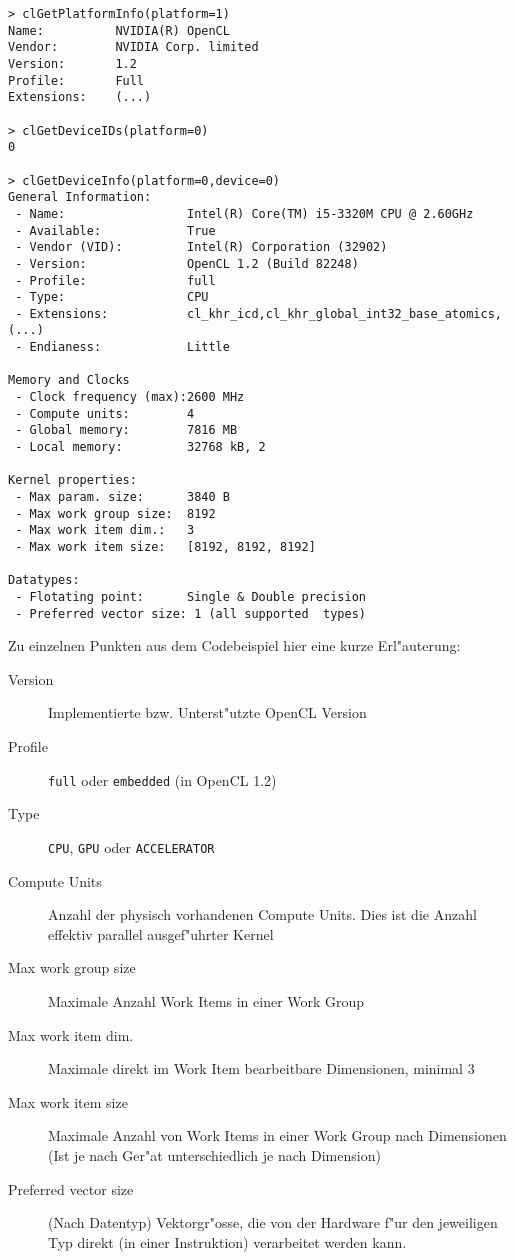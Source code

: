 \begin{refsection}
\begin{small}
\begin{verbatim}
> clGetPlatformInfo(platform=1)
Name:          NVIDIA(R) OpenCL
Vendor:        NVIDIA Corp. limited
Version:       1.2
Profile:       Full
Extensions:    (...)

> clGetDeviceIDs(platform=0)
0

> clGetDeviceInfo(platform=0,device=0)
General Information:
 - Name:                 Intel(R) Core(TM) i5-3320M CPU @ 2.60GHz
 - Available:            True
 - Vendor (VID):         Intel(R) Corporation (32902)
 - Version:              OpenCL 1.2 (Build 82248)
 - Profile:              full
 - Type:                 CPU 
 - Extensions:           cl_khr_icd,cl_khr_global_int32_base_atomics,(...)
 - Endianess:            Little

Memory and Clocks
 - Clock frequency (max):2600 MHz
 - Compute units:        4
 - Global memory:        7816 MB
 - Local memory:         32768 kB, 2

Kernel properties:
 - Max param. size:      3840 B
 - Max work group size:  8192
 - Max work item dim.:   3
 - Max work item size:   [8192, 8192, 8192]

Datatypes:
 - Flotating point:      Single & Double precision
 - Preferred vector size: 1 (all supported  types)
\end{verbatim}
\end{small}

\vspace{1em}

\noindent Zu einzelnen Punkten aus dem Codebeispiel hier eine kurze Erl"auterung:

\begin{description}
 \item [Version] Implementierte bzw. Unterst"utzte OpenCL Version
 \item [Profile] \texttt{full} oder \texttt{embedded} (in OpenCL 1.2)
 \item [Type]    \texttt{CPU}, \texttt{GPU} oder \texttt{ACCELERATOR}
 \item [Compute Units] Anzahl der physisch vorhandenen Compute Units. Dies ist
                 die Anzahl effektiv parallel ausgef"uhrter Kernel
 \item [Max work group size] Maximale Anzahl Work Items in einer Work Group
 \item [Max work item dim.] Maximale direkt im Work Item bearbeitbare Dimensionen, minimal 3
 \item [Max work item size] Maximale Anzahl von Work Items in einer Work Group nach
                 Dimensionen (Ist je nach Ger"at unterschiedlich je nach
                 Dimension)
 \item [Preferred vector size] (Nach Datentyp) Vektorgr"osse, die von der Hardware 
                 f"ur den jeweiligen Typ direkt (in einer Instruktion) verarbeitet
                 werden kann.
 

\end{description}
\end{refsection}
